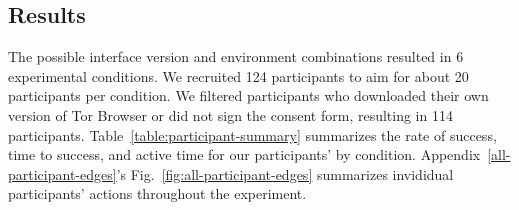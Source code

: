 \documentclass[USenglish,oneside,twocolumn]{article}
\begin{document}
\subsection{Results} 
{\color {red} 
The possible interface version and environment combinations resulted in 6 experimental conditions. We recruited 124 participants to aim for about 20 participants per condition. We filtered participants who downloaded their own version of Tor Browser or did not sign the consent form, resulting in 114 participants. Table~\ref{table:participant-summary} summarizes the rate of success, time to success, and active time for our participants' by condition. Appendix~\ref{all-participant-edges}'s Fig.~\ref{fig:all-participant-edges} summarizes invididual participants' actions throughout the experiment.





}
\end{document}
